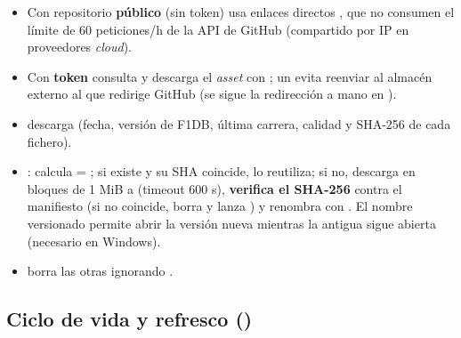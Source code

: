 \begin{itemize}
\item Con repositorio \textbf{público} (sin token) usa enlaces directos , que no consumen el límite de 60 peticiones/h de la API de GitHub (compartido por IP en proveedores \emph{cloud}).
\item Con \textbf{token} consulta  y descarga el \emph{asset} con ; un  evita reenviar  al almacén externo al que redirige GitHub (se sigue la redirección a mano en ).
\item {} descarga  (fecha, versión de F1DB, última carrera, calidad y SHA-256 de cada fichero).
\item {}: calcula  = ; si existe y su SHA coincide, lo reutiliza; si no, descarga en bloques de 1 MiB a  (timeout 600 s), \textbf{verifica el SHA-256} contra el manifiesto (si no coincide, borra y lanza ) y renombra con . El nombre versionado permite abrir la versión nueva mientras la antigua sigue abierta (necesario en Windows).
\item {} borra las otras  ignorando .
\end{itemize}

\subsection{Ciclo de vida y refresco ()}

